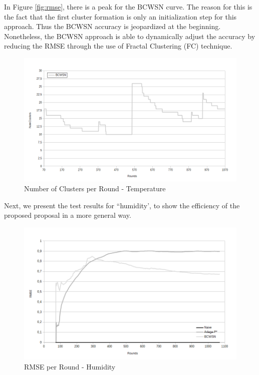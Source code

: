 \documentclass{acm_proc_article-sp}
\begin{document}
In Figure \ref{fig:rmse}, there is a peak for the BCWSN curve. The reason
for this is the fact that the first cluster formation is only an
initialization step for this approach. Thus the BCWSN accuracy is jeopardized 
at the beginning. Nonetheless, the BCWSN approach is able to dynamically adjust 
the accuracy by reducing the RMSE through the use of Fractal Clustering (FC) technique.
\begin{figure}[!htb]
\begin{center}
	\includegraphics[scale=0.34]{BCWSN-NumClustersxRound-PB.png}
	 \vspace*{-.6cm}
    \caption{Number of Clusters per Round - Temperature}
    \label{fig:num-clts}
\end{center}
\end{figure}

Next, we present the test results for ``humidity', 
to show the efficiency of the proposed proposal in a more general way.

\begin{figure}[!htb]
\begin{center}
	\includegraphics[scale=0.37]{BCWSN-RMSExRound-PB-Hum.png}
	 \vspace*{-.6cm}
    \caption{RMSE per Round - Humidity}
    \label{fig:rmse-hum}
\end{center}
\end{figure}
\vspace*{-.3cm}
\end{document}
